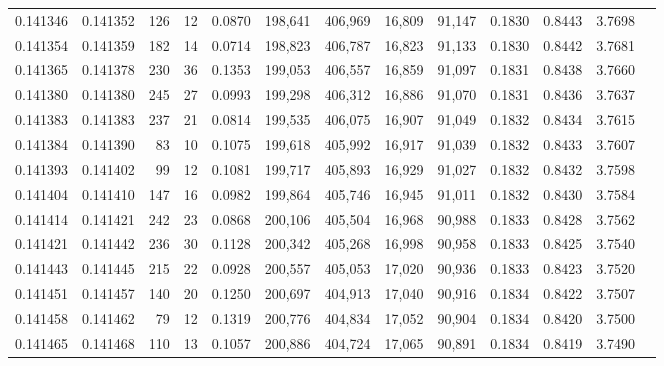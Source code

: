 \begin{tabular}{rrrrrrrrrrrrr}
0.141346 & 0.141352 &   126 &  12 &                                     0.0870 & 198,641 & 406,969 &  16,809 &  91,147 & 0.1830 & 0.8443 & 3.7698 \\
0.141354 & 0.141359 &   182 &  14 &                                     0.0714 & 198,823 & 406,787 &  16,823 &  91,133 & 0.1830 & 0.8442 & 3.7681 \\
0.141365 & 0.141378 &   230 &  36 &                                     0.1353 & 199,053 & 406,557 &  16,859 &  91,097 & 0.1831 & 0.8438 & 3.7660 \\
0.141380 & 0.141380 &   245 &  27 &                                     0.0993 & 199,298 & 406,312 &  16,886 &  91,070 & 0.1831 & 0.8436 & 3.7637 \\
0.141383 & 0.141383 &   237 &  21 &                                     0.0814 & 199,535 & 406,075 &  16,907 &  91,049 & 0.1832 & 0.8434 & 3.7615 \\
0.141384 & 0.141390 &    83 &  10 &                                     0.1075 & 199,618 & 405,992 &  16,917 &  91,039 & 0.1832 & 0.8433 & 3.7607 \\
0.141393 & 0.141402 &    99 &  12 &                                     0.1081 & 199,717 & 405,893 &  16,929 &  91,027 & 0.1832 & 0.8432 & 3.7598 \\
0.141404 & 0.141410 &   147 &  16 &                                     0.0982 & 199,864 & 405,746 &  16,945 &  91,011 & 0.1832 & 0.8430 & 3.7584 \\
0.141414 & 0.141421 &   242 &  23 &                                     0.0868 & 200,106 & 405,504 &  16,968 &  90,988 & 0.1833 & 0.8428 & 3.7562 \\
0.141421 & 0.141442 &   236 &  30 &                                     0.1128 & 200,342 & 405,268 &  16,998 &  90,958 & 0.1833 & 0.8425 & 3.7540 \\
0.141443 & 0.141445 &   215 &  22 &                                     0.0928 & 200,557 & 405,053 &  17,020 &  90,936 & 0.1833 & 0.8423 & 3.7520 \\
0.141451 & 0.141457 &   140 &  20 &                                     0.1250 & 200,697 & 404,913 &  17,040 &  90,916 & 0.1834 & 0.8422 & 3.7507 \\
0.141458 & 0.141462 &    79 &  12 &                                     0.1319 & 200,776 & 404,834 &  17,052 &  90,904 & 0.1834 & 0.8420 & 3.7500 \\
0.141465 & 0.141468 &   110 &  13 &                                     0.1057 & 200,886 & 404,724 &  17,065 &  90,891 & 0.1834 & 0.8419 & 3.7490 \\

\end{tabular}

